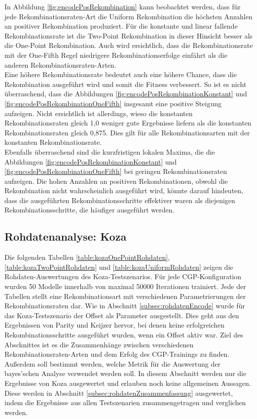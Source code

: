 In Abbildung \ref{fig:encodePosRekombination} kann beobachtet werden, dass für jede Rekombinationsraten-Art die Uniform Rekombination die höchsten Anzahlen an positiver Rekombination produziert.
Für die konstante und linear fallende Rekombinationsrate ist die Two-Point Rekombination in dieser Hinsicht besser als die One-Point Rekombination.
Auch wird ersichtlich, dass die Rekombinationsrate mit der One-Fifth Regel niedrigere Rekombinationserfolge einfährt als die anderen Rekombinationsraten-Arten.\\
Eine höhere Rekombinationsrate bedeutet auch eine höhere Chance, dass die Rekombination ausgeführt wird und somit die Fitness verbessert.
So ist es nicht überraschend, dass die Abbildungen \ref{fig:encodePosRekombinationKonstant} und \ref{fig:encodePosRekombinationOneFifth} insgesamt eine positive Steigung aufzeigen.
Nicht ersichtlich ist allerdings, wieso die konstanten Rekombinationsraten gleich 1,0 weniger gute Ergebnisse liefern als die konstanten Rekombinationsraten gleich 0,875.
Dies gilt für alle Rekombinationsarten mit der konstanten Rekombinationsrate.\\
Ebenfalls überraschend sind die kurzfristigen lokalen Maxima, die die Abbildungen \ref{fig:encodePosRekombinationKonstant} und \ref{fig:encodePosRekombinationOneFifth} bei geringen Rekombinationsraten aufzeigen.
Die hohen Anzahlen an positiven Rekombinationen, obwohl die Rekombination nicht wahrscheinlich ausgeführt wird, könnte darauf hindeuten, dass die ausgeführten Rekombinationsschritte effektiver waren als diejenigen Rekombinationsschritte, die häufiger ausgeführt werden.


\subsection{Rohdatenanalyse: Koza}
\label{subsec:rohdatenKoza}

Die folgenden Tabellen \ref{table:kozaOnePointRohdaten}, \ref{table:kozaTwoPointRohdaten} und \ref{table:kozaUniformRohdaten} zeigen die Rohdaten-Auswertungen des Koza-Testszenarios.
Für jede CGP-Konfiguration wurden 50 Modelle innerhalb von maximal 50000 Iterationen trainiert.
Jede der Tabellen stellt eine Rekombinationsart mit verschiedenen Parametrierungen der Rekombinationsraten dar.
Wie in Abschnitt \ref{subsec:rohdatenEncode} wurde für das Koza-Testszenario der Offset als Parameter ausgestellt.
Dies geht aus den Ergebnissen von Parity und Keijzer hervor, bei denen keine erfolgreichen Rekombinationsschritte ausgeführt wurden, wenn ein Offset aktiv war.
Ziel des Abschnittes ist es die Zusammenhänge zwischen verschiedenen Rekombinationsraten-Arten und dem Erfolg des CGP-Trainings zu finden.
Außerdem soll bestimmt werden, welche Metrik für die Auswertung der bayes'schen Analyse verwendet werden soll.
In diesem Abschnitt werden nur die Ergebnisse von Koza ausgewertet und erlauben noch keine allgemeinen Aussagen.
Diese werden in Abschnitt \ref{subsec:rohdatenZusammenfassung} ausgewertet, indem die Ergebnisse aus allen Testszenarien zusammengetragen und verglichen werden.


